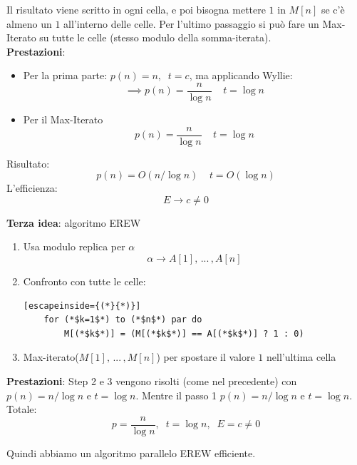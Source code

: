 \documentclass[11pt]{article}
\begin{document}
	Il risultato viene scritto in ogni cella, e poi bisogna mettere $1$ in $M[n]$ se c'è almeno un $1$ all'interno delle celle. Per l'ultimo passaggio si può fare un Max-Iterato su tutte le celle (stesso modulo della somma-iterata).\\
	
	\textbf{Prestazioni}: 
	\begin{itemize}
		\item Per la prima parte: $p(n) = n, \;\; t = c$, ma applicando Wyllie: 
		$$ \implies p(n) = \frac{n}{\log n} \;\;\;\; t = \log n$$
		\item Per il Max-Iterato 
		$$ p(n) = \frac{n}{\log n} \;\;\;\; t = \log n $$
	\end{itemize}
	Risultato: 
	$$ p(n) = O (n/\log n) \;\;\;\; t = O (\log n) $$
	L'efficienza: 
	$$ E \rightarrow c \neq 0$$
	
	\newpage
	
	\textbf{Terza idea}: algoritmo EREW
	\begin{enumerate}
		\item Usa modulo replica per $\alpha$
		$$ \alpha \rightarrow A[1], \, ... \, , A[n] $$
		\item Confronto con tutte le celle: 
		\begin{lstlisting}[escapeinside={(*}{*)}]
	for (*$k=1$*) to (*$n$*) par do 
		M[(*$k$*)] = (M[(*$k$*)] == A[(*$k$*)] ? 1 : 0)
		\end{lstlisting}
		\item Max-iterato($M[1], \, ... \, , M[n]$) per spostare il valore $1$ nell'ultima cella
	\end{enumerate}
	
	\textbf{Prestazioni}: 
	Step 2 e 3 vengono risolti (come nel precedente) con $ p(n) = n/\log n$ e $t = \log n$.  Mentre il passo 1 $ p(n) = n/\log n$ e $t = \log n$.\\
	Totale: 
	$$ p = \frac{n}{\log n}, \;\; t = \log n, \;\; E = c \neq 0 $$
	
	Quindi abbiamo un algoritmo parallelo EREW efficiente.\\
	
	\vfill
	
\end{document}

